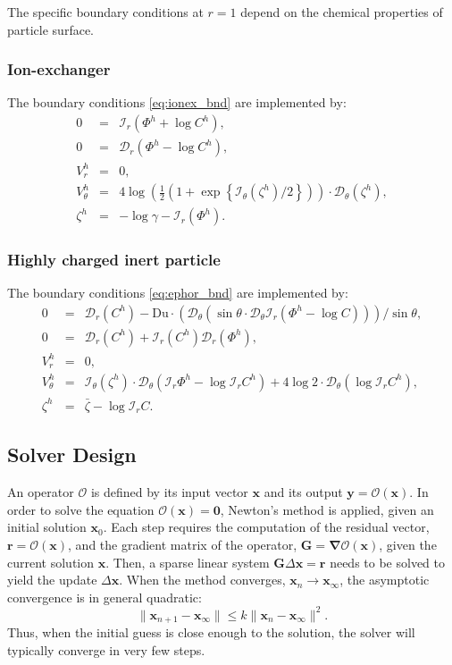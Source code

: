 \documentclass[10pt]{ijnam}
\newcommand{\pars}[1]{\left(#1\right)}
\newcommand\bnabla{\boldsymbol{\nabla}}
\newcommand\bG{\boldsymbol{G}}
\newcommand\bx{\boldsymbol{x}}
\newcommand\by{\boldsymbol{y}}
\newcommand\br{\boldsymbol{r}}
\newcommand\bzero{\boldsymbol{0}}
\newcommand\cO{\mathcal{O}}
\newcommand\cI{\mathcal{I}}
\newcommand\cD{\mathcal{D}}
\begin{document}
The specific boundary conditions at $r=1$
depend on the chemical properties of particle surface.

\subsubsection{Ion-exchanger} The boundary conditions \eqref{eq:ionex_bnd} 
are implemented by:
\begin{equation}
\begin{array}{rcl}
0 &=& \cI_r(\varPhi^h + \log C^h), \\
0 &=& \cD_r(\varPhi^h - \log C^h), \\
V^h_r &=& 0, \\
V^h_\theta &=& 4\log\pars{\frac{1}{2}\pars{1 + \exp\left\{\cI_\theta(\zeta^h)/2\right\}}} \cdot 
			\cD_\theta(\zeta^h), \\
  \zeta^h &=& - \log \gamma - \cI_r(\varPhi^h).
\end{array}
\end{equation}

\subsubsection{Highly charged inert particle} The boundary conditions \eqref{eq:ephor_bnd} 
are implemented by:
\begin{equation}
\begin{array}{rcl}
0 &=& \cD_r(C^h) - \text{Du} \cdot 
\pars{\cD_\theta \pars{\sin\theta \cdot \cD_\theta \cI_r\pars{\varPhi^h - \log C}}}/{\sin\theta}, \\
0 &=& \cD_r(C^h) + \cI_r(C^h) \cD_r(\varPhi^h), \\
V^h_r &=& 0, \\
V^h_\theta &=& \cI_\theta(\zeta^h) \cdot \cD_\theta(\cI_r \varPhi^h - \log \cI_r C^h) + 
4 \log 2 \cdot \cD_\theta(\log \cI_r C^h), \\
  \zeta^h &=& \bar{\zeta} - \log \cI_r C.
\end{array}
\end{equation}

\subsection{Solver Design}
An operator $\cO$ is defined by its input vector $\bx$ and its output 
$\by = \cO(\bx)$.
In order to solve the equation $\cO(\bx) = \bzero$, Newton's method is applied, 
given an initial solution $\bx_0$.
Each step requires the computation of the residual vector, $\br = \cO(\bx)$, and
the gradient matrix of the operator, $\bG = \bnabla \cO(\bx)$, 
given the current solution $\bx$.
Then, a sparse linear system $\bG \Delta \bx = \br$
needs to be solved to yield the update $\Delta \bx$.
When the method converges, $\bx_n \rightarrow \bx_\infty$, 
the asymptotic convergence is in general quadratic:
\begin{equation}
\|\bx_{n+1} - \bx_\infty\| \le k \|\bx_{n} - \bx_\infty\|^2.
\end{equation}
Thus, when the initial guess is close enough to the solution, the solver
will typically converge in very few steps.
\end{document}
